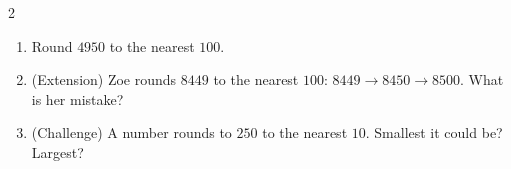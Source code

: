 \documentclass{beamer}
\newcommand{\ashow}[1]{\uncover<2->{\textcolor{red}{\small #1}}}
\begin{document}
\begin{frame}
\begin{columns}[T]
\begin{multicols}{2}
\begin{enumerate}
  \columnbreak

  \item Round $4950$ to the nearest $100$. \ashow{$5000$}

  \item (Extension) Zoe rounds $8449$ to the nearest $100$: $8449\to 8450\to 8500$. What is her mistake? \ashow{Rounded twice: only the tens digit $4$ counts, so $8400$}

  \item (Challenge) A number rounds to $250$ to the nearest $10$. Smallest it could be? Largest? \ashow{$245$ and $254$}

\end{enumerate}
\end{multicols}

\end{columns}

\end{frame}
\end{document}
